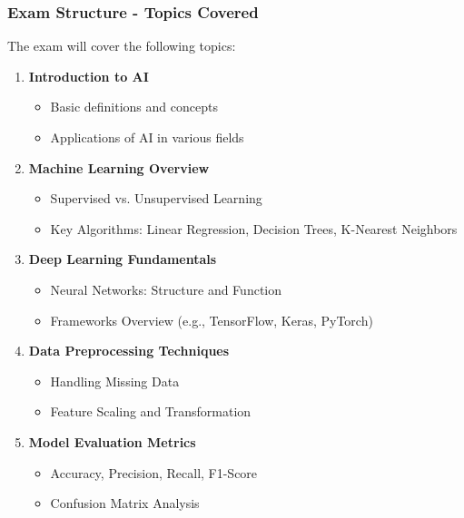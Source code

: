 \documentclass[aspectratio=169]{beamer}
\begin{document}
\begin{frame}[fragile]
    \frametitle{Exam Structure - Topics Covered}
    The exam will cover the following topics:
    \begin{enumerate}
        \item \textbf{Introduction to AI}
            \begin{itemize}
                \item Basic definitions and concepts
                \item Applications of AI in various fields
            \end{itemize}
        \item \textbf{Machine Learning Overview}
            \begin{itemize}
                \item Supervised vs. Unsupervised Learning
                \item Key Algorithms: Linear Regression, Decision Trees, K-Nearest Neighbors
            \end{itemize}
        \item \textbf{Deep Learning Fundamentals}
            \begin{itemize}
                \item Neural Networks: Structure and Function
                \item Frameworks Overview (e.g., TensorFlow, Keras, PyTorch)
            \end{itemize}
        \item \textbf{Data Preprocessing Techniques}
            \begin{itemize}
                \item Handling Missing Data
                \item Feature Scaling and Transformation
            \end{itemize}
        \item \textbf{Model Evaluation Metrics}
            \begin{itemize}
                \item Accuracy, Precision, Recall, F1-Score
                \item Confusion Matrix Analysis
            \end{itemize}
    \end{enumerate}
\end{frame}
\end{document}
